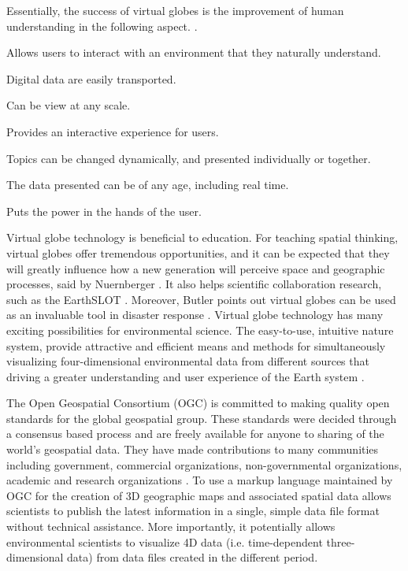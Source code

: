 Essentially, the success of virtual globes is the improvement of human understanding in the following aspect. \cite{tuttle.virtual-globes.2008}. 

\begin{description}
	\setlength{\parskip}{0pt}
    \item[$\bullet$ pseudo-3D] Allows users to interact with an environment that they naturally understand.
	\item[$\bullet$ Transportability] Digital data are easily transported.
	\item[$\bullet$ Scalability] Can be view at any scale.
	\item[$\bullet$ Interactivity] Provides an interactive experience for users.
	\item[$\bullet$ Choice of topics] Topics can be changed dynamically, and presented individually or together.
	\item[$\bullet$ Currency] The data presented can be of any age, including real time.
	\item[$\bullet$ Client-side] Puts the power in the hands of the user.
\end{description}

Virtual globe technology is beneficial to education. For teaching spatial thinking, virtual globes offer tremendous opportunities, and it can be expected that they will greatly influence how a new generation will perceive space and geographic processes, said by Nuernberger \cite{nuernberger.vr-classroom.2006}. It also helps scientific collaboration research, such as the EarthSLOT \cite{earthslot.2016}. Moreover, Butler points out virtual globes can be used as an invaluable tool in disaster response \cite{butler.vg.2006, nourbakhsh.mapping-disaster-zones.2006}. Virtual globe technology has many exciting possibilities for environmental science. The easy-to-use, intuitive nature system, provide attractive and efficient means and methods for simultaneously visualizing four-dimensional environmental data from different sources that driving a greater understanding and user experience of the Earth system \cite{blower.sharing-visualizing.2007}.

The Open Geospatial Consortium (OGC) is committed to making quality open standards for the global geospatial group. These standards were decided through a consensus based process and are freely available for anyone to sharing of the world's geospatial data. They have made contributions to many communities including government, commercial organizations, non-governmental organizations, academic and research organizations \cite{ogc.2016}. To use a markup language maintained by OGC for the creation of 3D geographic maps and associated spatial data allows scientists to publish the latest information in a single, simple data file format without technical assistance. More importantly, it potentially allows environmental scientists to visualize 4D data (i.e. time-dependent three-dimensional data) from data files created in the different period.

